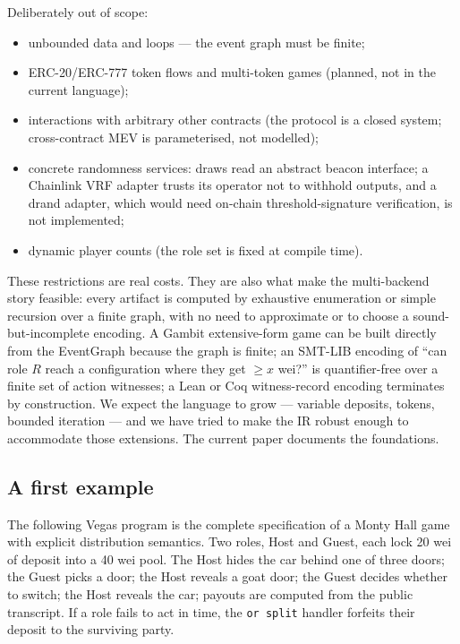 Deliberately out of scope:

\begin{itemize}\itemsep1pt
\item unbounded data and loops --- the event graph must be finite;
\item ERC-20/ERC-777 token flows and multi-token games (planned, not
  in the current language);
\item interactions with arbitrary other contracts (the protocol
  is a closed system; cross-contract MEV is parameterised, not
  modelled);
\item concrete randomness services: draws read an abstract beacon
  interface; a Chainlink VRF adapter trusts its operator not to
  withhold outputs, and a drand adapter, which would need on-chain
  threshold-signature verification, is not implemented;
\item dynamic player counts (the role set is fixed at compile time).
\end{itemize}

These restrictions are real costs.  They are also what make the
multi-backend story feasible: every artifact is computed by
exhaustive enumeration or simple recursion over a finite graph, with
no need to approximate or to choose a sound-but-incomplete encoding.
A Gambit extensive-form game can be built directly from the
EventGraph because the graph is finite; an SMT-LIB encoding of
``can role $R$ reach a configuration where they get $\geq x$ wei?''
is quantifier-free over a finite set of action witnesses; a Lean or
Coq witness-record encoding terminates by construction.  We expect
the language to grow --- variable deposits, tokens, bounded
iteration --- and we have tried to make the IR robust enough to
accommodate those extensions.  The current paper documents the
foundations.

\subsection{A first example}
\label{sec:intro:first-example}

The following Vegas program is the complete specification of a
Monty Hall game with explicit distribution semantics.  Two roles, Host and Guest,
each lock 20 wei of deposit into a 40 wei pool.  The Host hides the
car behind one of three doors; the Guest picks a door; the Host
reveals a goat door; the Guest decides whether to switch; the Host
reveals the car; payouts are computed from the public transcript.
If a role fails to act in time, the \texttt{or split} handler
forfeits their deposit to the surviving party.

